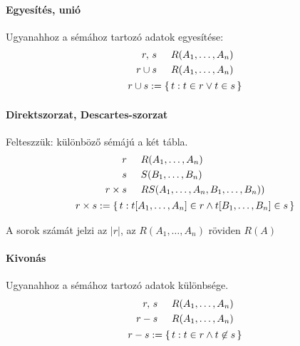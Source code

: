 \documentclass[fleqn,10pt,a4paper]{article}
\theoremstyle{magyar}
\begin{document}
  \paragraph{Egyesítés, unió} Ugyanahhoz a sémához tartozó adatok egyesítése:
  \begin{gather*}
    \begin{split}
      r,\, s  & \hspace{0.5cm} R(A_1, \ldots, A_n)\\   
      r \cup s & \hspace{0.5cm} R(A_1, \ldots, A_n)
    \end{split}\\
    r \cup s := \{\, t : t\in r \lor t\in s \,\}
  \end{gather*}
  
  \paragraph{Direktszorzat, Descartes-szorzat} Felteszzük: különböző sémájú a két tábla.
  \begin{gather*}
    \begin{split}
      r  & \hspace{0.5cm} R(A_1, \ldots, A_n)\\
      s  & \hspace{0.5cm} S(B_1, \ldots, B_n)\\
      r \times s & \hspace{0.5cm} RS(A_1, \ldots, A_n, B_1, \ldots, B_n))
    \end{split}\\
    r \times s := \{\, t : t[A_1, \ldots, A_n] \in r \land t[B_1, \ldots, B_n] \in s \,\}
  \end{gather*}
  
  A sorok számát jelzi az $|r|$, az $R(A_1, \ldots, A_n)$ röviden $R(A)$

  
  \paragraph{Kivonás} Ugyanahhoz a sémához tartozó adatok különbsége.
  \begin{gather*}
    \begin{split}
      r,\, s  & \hspace{0.5cm} R(A_1, \ldots, A_n)\\   
      r - s & \hspace{0.5cm} R(A_1, \ldots, A_n)
    \end{split}\\
    r -  s := \{\, t : t\in r \land t\not\in s \,\}
  \end{gather*}
  
\end{document}
